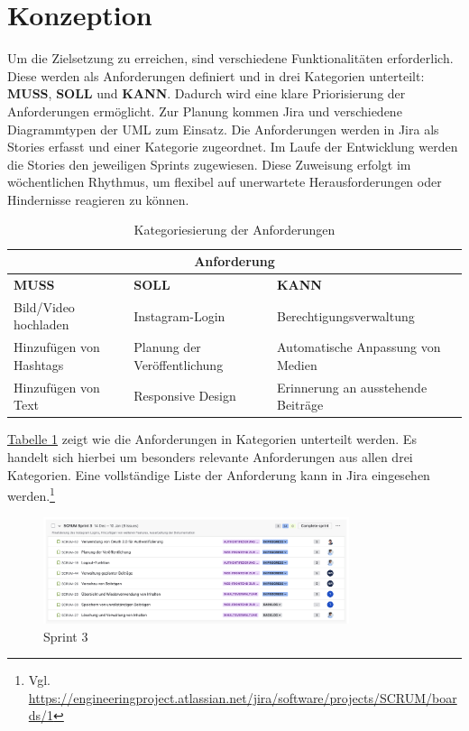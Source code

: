 \chapter{Konzeption}
\label{sec:chapter2}

Um die Zielsetzung zu erreichen, sind verschiedene Funktionalitäten erforderlich. Diese werden als Anforderungen definiert und in drei Kategorien unterteilt: 
\textbf{MUSS}, \textbf{SOLL} und \textbf{KANN}. Dadurch wird eine klare Priorisierung der Anforderungen ermöglicht. Zur Planung kommen Jira und verschiedene 
Diagrammtypen der \ac{UML} zum Einsatz. Die Anforderungen werden in Jira als Stories erfasst und einer Kategorie zugeordnet. Im Laufe der Entwicklung werden die Stories den 
jeweiligen Sprints zugewiesen. Diese Zuweisung erfolgt im wöchentlichen Rhythmus, um flexibel auf unerwartete Herausforderungen oder Hindernisse reagieren zu können.

\begin{table}[htb]
    \centering
    \renewcommand{\arraystretch}{1.3}
    \begin{tabular}{|p{4cm}|p{4cm}|p{4cm}|}
        \hline
        \multicolumn{3}{|c|}{\textbf{Anforderung}} \\ \hline
        \textbf{MUSS} & \textbf{SOLL} & \textbf{KANN} \\ \hline
        Bild/Video hochladen & Instagram-Login & Berechtigungsverwaltung \\ \hline
        Hinzufügen von Hashtags & Planung der Veröffentlichung & Automatische Anpassung von Medien \\ \hline
        Hinzufügen von Text & Responsive Design & Erinnerung an ausstehende Beiträge \\ \hline
    \end{tabular}
    \caption{Kategoriesierung der Anforderungen}
    \label{tab:tab-1}
\end{table}

\hyperref[tab:tab-1]{Tabelle 1} zeigt wie die Anforderungen in Kategorien unterteilt werden. Es handelt sich hierbei um besonders relevante Anforderungen aus
allen drei Kategorien. Eine vollständige Liste der Anforderung kann in Jira eingesehen werden.\footnote{Vgl. \url{https://engineeringproject.atlassian.net/jira/software/projects/SCRUM/boards/1}}

\begin{figure}[htb]
    \centering
    \includegraphics[width=0.8\textwidth]{graphics/sprint_3_jira.png}
    \caption{Sprint 3}
    \label{fig:fig-1}
\end{figure}

